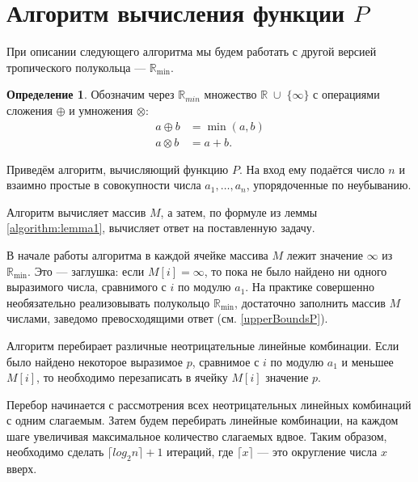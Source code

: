 \documentclass[12pt]{article}
\theoremstyle{definition}
\newtheorem{definition}[theorem]{Определение}
\begin{document}
\section{Алгоритм вычисления функции $P$}
\label{algorithmSection}

При описании следующего алгоритма мы будем работать с другой версией тропического полукольца --- $\mathbb{R}_{\min}$.

\begin{definition}
Обозначим через $\mathbb{R}_{min}$ множество $\mathbb{R} \; \cup \; \{ \infty\}$ с операциями сложения $\oplus$ и умножения $\otimes$:
\begin{align*}
            a \oplus b &= \min(a, b)\\
            a \otimes b &= a + b.
        \end{align*}
\end{definition}

Приведём алгоритм, вычисляющий функцию $P$. На вход ему подаётся  число $n$ и взаимно простые в совокупности числа $a_1, \dots, a_n$, упорядоченные по неубыванию.

Алгоритм вычисляет массив $M$, а затем, по формуле из леммы \ref{algorithm:lemma1}, вычисляет ответ на поставленную задачу.

В начале работы алгоритма в каждой ячейке массива $M$ лежит значение $\infty$ из $\mathbb{R}_{\min}$. Это --- заглушка: если $M[i] = \infty$,  то пока не было найдено ни одного выразимого числа, сравнимого с $i$ по модулю $a_1$. На практике совершенно необязательно реализовывать полукольцо $\mathbb{R}_{\min}$, достаточно заполнить массив $M$ числами, заведомо превосходящими ответ (см. \ref{upperBoundsP}).

Алгоритм перебирает различные неотрицательные линейные комбинации. Если было найдено некоторое выразимое $p$, сравнимое с $i$ по модулю $a_1$ и меньшее $M[i]$, то необходимо перезаписать в ячейку $M[i]$ значение $p$.


Перебор начинается с рассмотрения всех неотрицательных линейных комбинаций с одним слагаемым. Затем будем перебирать линейные комбинации, на каждом шаге увеличивая максимальное количество слагаемых вдвое. Таким образом, необходимо сделать $\lceil log_2n \rceil + 1$ итераций, где $\lceil x \rceil$ --- это округление числа $x$ вверх.
\end{document}
